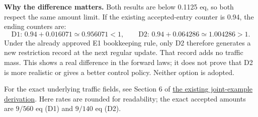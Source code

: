 \documentclass[11pt,a4paper]{article}
\begin{document}
\textbf{Why the difference matters.} Both results are below 0.1125 eq, so both
respect the same amount limit. If the existing accepted-entry counter is 0.94,
the ending counters are:
\[
\text{D1: }0.94+0.016071\simeq0.956071<1,
\qquad
\text{D2: }0.94+0.064286\simeq1.004286>1.
\]
Under the already approved E1 bookkeeping rule, only D2 therefore generates a
new restriction record at the next regular update. That record adds no traffic
mass. This shows a real difference in the forward laws; it does not prove that
D2 is more realistic or gives a better control policy. Neither option is adopted.

\small
For the exact underlying traffic fields, see Section 6 of
\href{fixed_share_completion_math.pdf}{the existing joint-example derivation}.
Here rates are rounded for readability; the exact accepted amounts are
$9/560$ eq (D1) and $9/140$ eq (D2).
\end{document}
